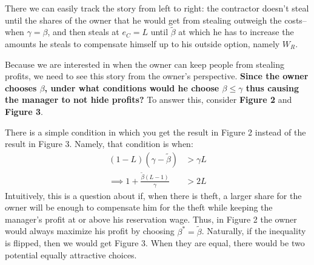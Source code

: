 \documentclass[12pt]{paper}
\begin{document}
There we can easily track the story from left to right: the contractor doesn't steal until the shares of the owner that he would get from stealing outweigh the costs--when $\gamma=\beta$, and then steals at $e_C=L$ until $\tilde{\beta}$ at which he has to increase the amounts he steals to compensate himself up to his outside option, namely $W_R$.

Because we are interested in when the owner can keep people from stealing profits, we need to see this story from the owner's perspective. \textbf{Since the owner chooses $\beta$, under what conditions would he choose $\beta \leq \gamma$ thus causing the manager to not hide profits?} To answer this, consider \textbf{Figure 2} and \textbf{Figure 3}.

There is a simple condition in which you get the result in Figure 2 instead of the result in Figure 3. Namely, that condition is when:
\begin{align*}
(1-L)(\gamma-\tilde{\beta})&> \gamma L\\
\implies 1+\frac{\tilde{\beta}(L-1)}{\gamma} &>2L
\end{align*}
Intuitively, this is a question about if, when there is theft, a larger share for the owner will be enough to compensate him for the theft while keeping the manager's profit at or above his reservation wage. Thus, in Figure 2 the owner would always maximize his profit by choosing $\beta^*=\tilde{\beta}$. Naturally, if the inequality is flipped, then we would get Figure 3. When they are equal, there would be two potential equally attractive choices.
\end{document}
